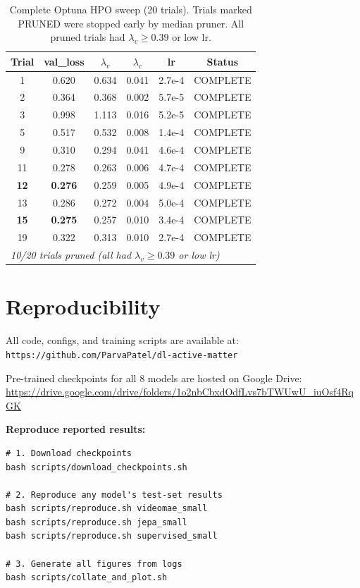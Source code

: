 \documentclass{article}
\begin{document}
\begin{table}[H]
\caption{Complete Optuna HPO sweep (20 trials). Trials marked PRUNED were stopped early by median pruner. All pruned trials had $\lambda_v \geq 0.39$ or low lr.}
\centering
\small
\begin{tabular}{@{}cccccc@{}}
\toprule
Trial & val\_loss & $\lambda_v$ & $\lambda_c$ & lr & Status \\
\midrule
1 & 0.620 & 0.634 & 0.041 & 2.7e-4 & COMPLETE \\
2 & 0.364 & 0.368 & 0.002 & 5.7e-5 & COMPLETE \\
3 & 0.998 & 1.113 & 0.016 & 5.2e-5 & COMPLETE \\
5 & 0.517 & 0.532 & 0.008 & 1.4e-4 & COMPLETE \\
9 & 0.310 & 0.294 & 0.041 & 4.6e-4 & COMPLETE \\
11 & 0.278 & 0.263 & 0.006 & 4.7e-4 & COMPLETE \\
\textbf{12} & \textbf{0.276} & 0.259 & 0.005 & 4.9e-4 & COMPLETE \\
13 & 0.286 & 0.272 & 0.004 & 5.0e-4 & COMPLETE \\
\textbf{15} & \textbf{0.275} & 0.257 & 0.010 & 3.4e-4 & COMPLETE \\
19 & 0.322 & 0.313 & 0.010 & 2.7e-4 & COMPLETE \\
\midrule
\multicolumn{6}{l}{\textit{10/20 trials pruned (all had $\lambda_v \geq 0.39$ or low lr)}} \\
\bottomrule
\end{tabular}
\end{table}

\section{Reproducibility}

All code, configs, and training scripts are available at:
\texttt{https://github.com/ParvaPatel/dl-active-matter}

Pre-trained checkpoints for all 8 models are hosted on Google Drive:\\ \url{https://drive.google.com/drive/folders/1o2nbCbxdOdfLvs7bTWUwU_iuOsf4RqGK}

\textbf{Reproduce reported results:}
\begin{verbatim}
# 1. Download checkpoints
bash scripts/download_checkpoints.sh

# 2. Reproduce any model's test-set results
bash scripts/reproduce.sh videomae_small
bash scripts/reproduce.sh jepa_small
bash scripts/reproduce.sh supervised_small

# 3. Generate all figures from logs
bash scripts/collate_and_plot.sh
\end{verbatim}
\end{document}
